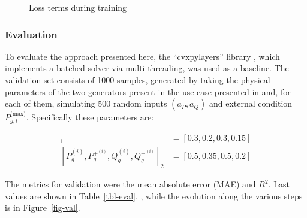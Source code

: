 \documentclass[
]{article}
\begin{document}
\begin{figure}


\caption{\label{fig-training}Loss terms during training}

\end{figure}%

\subsubsection{Evaluation}\label{evaluation}

To evaluate the approach presented here, the ``cvxpylayers'' library
\citep{agrawalDifferentiableConvexOptimization2019a}, which implements a
batched solver via multi-threading, was used as a baseline. The
validation set consists of 1000 samples, generated by taking the
physical parameters of the two generators present in the use case
presented in \citep{henryGymANMReinforcementLearning2021} and, for each
of them, simulating 500 random inputs \((a_P, a_Q)\) and external
condition \(P^{\textrm{(max)}}_{g,t}\). Specifically these parameters
are:

\begin{align}
    [\overline{P}_g^{(i)},  P_g^{+^{(i)}}, \overline{Q}_g^{(i)},  Q_g^{+^{(i)}}]_1 &= [0.3, 0.2, 0.3, 0.15]\\
    [\overline{P}_g^{(i)},  P_g^{+^{(i)}}, \overline{Q}_g^{(i)},  Q_g^{+^{(i)}}]_2 &= [0.5, 0.35, 0.5, 0.2]
\end{align}

The metrics for validation were the mean absolute error (MAE) and
\(R^2\). Last values are shown in Table~\ref{tbl-eval}, , while the
evolution along the various steps is in Figure~\ref{fig-val}.
\end{document}

